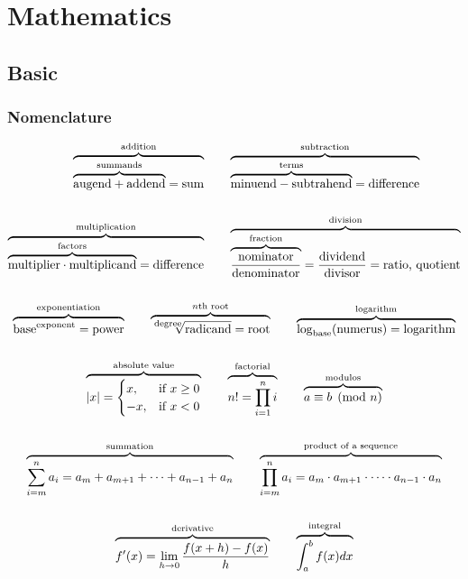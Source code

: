 \section{Mathematics}

\subsection{Basic}
\subsubsection{Nomenclature}


\begin{gather*}
\begin{alignedat}{1}
    \overbrace{
        \overbrace{
        \text{augend}+\text{addend}
        }^{\text{summands}}=\text{sum}
    }^{\text{addition}} \qquad
    &
    \overbrace{
        \overbrace{
        \text{minuend}-\text{subtrahend}
        }^{\text{terms}}=\text{difference}
    }^\text{subtraction}
    \\\\
    \overbrace{
        \overbrace{
        \text{multiplier}\cdot\text{multiplicand}
        }^{\text{factors}}=\text{difference}
    }^\text{multiplication} \qquad
    &
    \overbrace{
        \overbrace{
        \dfrac{\text{nominator}}{\text{denominator}}
        }^\text{fraction}=\dfrac{\text{dividend}}{\text{divisor}}=\text{ratio, quotient}
    }^\text{division}
\end{alignedat} \\\\
%
\overbrace{
    \text{base}^\text{exponent} = \text{power}
}^\text{exponentiation} \qquad
\overbrace{
    \sqrt[\text{\scriptsize degree}]{\text{radicand}}=\text{root}
}^{n\text{th root}} \qquad
\overbrace{
    \log_\text{base}(\text{numerus})=\text{logarithm}
}^\text{logarithm}
\\\\
%
\overbrace{
    |x| = \begin{cases} x, & \text{if } x \geq 0 \\ -x, & \text{if } x < 0 \end{cases}
}^\text{absolute value} \qquad
%
\overbrace{
    n! = \prod_{i=1}^{n} i
}^\text{factorial} \qquad
%
\overbrace{
    a \equiv b \pmod{n}
}^\text{modulos}
\\\\
%
\overbrace{
    \sum_{i=m}^n a_i = a_m + a_{m+1} + \cdots + a_{n-1} + a_n
}^\text{summation} \qquad
%
\overbrace{
    \prod_{i=m}^n a_i = a_m \cdot a_{m+1} \cdot \cdots \cdot a_{n-1} \cdot a_n
}^\text{product of a sequence}
\\\\
%
\overbrace{
    f'(x) = \lim_{h \to 0} \frac{f(x+h) - f(x)}{h}
}^\text{derivative} \qquad
%
\overbrace{
    \int_a^b f(x) dx
}^\text{integral}
\end{gather*}

